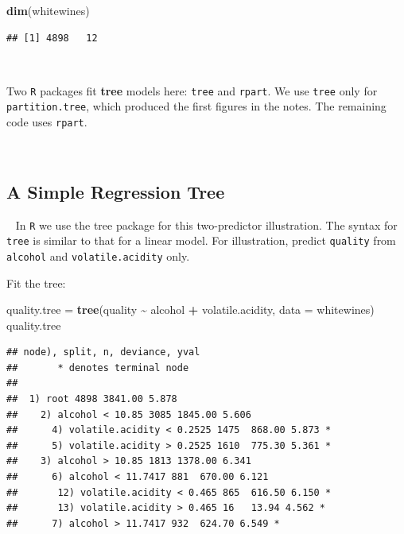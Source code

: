 \documentclass[
]{book}
\newenvironment{Shaded}{\begin{snugshade}}{\end{snugshade}}
\newcommand{\AttributeTok}[1]{\textcolor[rgb]{0.13,0.29,0.53}{#1}}
\newcommand{\FunctionTok}[1]{\textcolor[rgb]{0.13,0.29,0.53}{\textbf{#1}}}
\newcommand{\NormalTok}[1]{#1}
\newcommand{\OtherTok}[1]{\textcolor[rgb]{0.56,0.35,0.01}{#1}}
\newcommand{\SpecialCharTok}[1]{\textcolor[rgb]{0.81,0.36,0.00}{\textbf{#1}}}
\begin{document}
\begin{Shaded}
\begin{Highlighting}[]
\FunctionTok{dim}\NormalTok{(whitewines)}
\end{Highlighting}
\end{Shaded}

\begin{verbatim}
## [1] 4898   12
\end{verbatim}

~~

Two \texttt{R} packages fit \textbf{tree} models here: \texttt{tree} and \texttt{rpart}. We use \texttt{tree} only for \texttt{partition.tree}, which produced the first figures in the notes. The remaining code uses \texttt{rpart}.

~~

\subsection*{A Simple Regression Tree}\label{a-simple-regression-tree}

~
In \texttt{R} we use the tree package for this two-predictor illustration.
The syntax for \texttt{tree} is similar to that for a linear model. For illustration, predict \texttt{quality} from \texttt{alcohol} and \texttt{volatile.acidity} only.

Fit the tree:

\begin{Shaded}
\begin{Highlighting}[]
\NormalTok{quality.tree }\OtherTok{=} \FunctionTok{tree}\NormalTok{(quality }\SpecialCharTok{\textasciitilde{}}\NormalTok{ alcohol }\SpecialCharTok{+}\NormalTok{ volatile.acidity, }\AttributeTok{data =}\NormalTok{ whitewines)}
\NormalTok{quality.tree}
\end{Highlighting}
\end{Shaded}

\begin{verbatim}
## node), split, n, deviance, yval
##       * denotes terminal node
## 
##  1) root 4898 3841.00 5.878  
##    2) alcohol < 10.85 3085 1845.00 5.606  
##      4) volatile.acidity < 0.2525 1475  868.00 5.873 *
##      5) volatile.acidity > 0.2525 1610  775.30 5.361 *
##    3) alcohol > 10.85 1813 1378.00 6.341  
##      6) alcohol < 11.7417 881  670.00 6.121  
##       12) volatile.acidity < 0.465 865  616.50 6.150 *
##       13) volatile.acidity > 0.465 16   13.94 4.562 *
##      7) alcohol > 11.7417 932  624.70 6.549 *
\end{verbatim}
\end{document}
